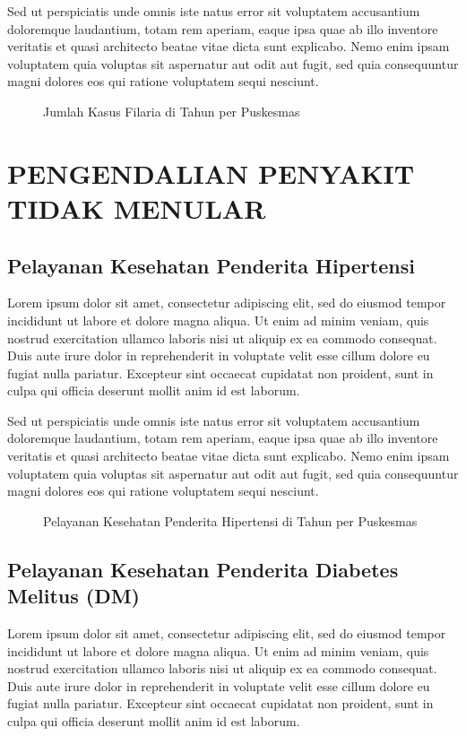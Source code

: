 Sed ut perspiciatis unde omnis iste natus error sit voluptatem accusantium doloremque laudantium, totam rem aperiam, eaque ipsa quae ab illo inventore veritatis et quasi architecto beatae vitae dicta sunt explicabo. Nemo enim ipsam voluptatem quia voluptas sit aspernatur aut odit aut fugit, sed quia consequuntur magni dolores eos qui ratione voluptatem sequi nesciunt.

\begin{figure}[H]
  \centering
  \caption{Jumlah Kasus Filaria di \namaKabupaten Tahun \tP per Puskesmas}
  \label{fig:Kasus-Filaria}
\end{figure}

\section[PENGENDALIAN PTM]{PENGENDALIAN PENYAKIT TIDAK MENULAR}
\subsection{Pelayanan Kesehatan Penderita Hipertensi}
Lorem ipsum dolor sit amet, consectetur adipiscing elit, sed do eiusmod tempor incididunt ut labore et dolore magna aliqua. Ut enim ad minim veniam, quis nostrud exercitation ullamco laboris nisi ut aliquip ex ea commodo consequat. Duis aute irure dolor in reprehenderit in voluptate velit esse cillum dolore eu fugiat nulla pariatur. Excepteur sint occaecat cupidatat non proident, sunt in culpa qui officia deserunt mollit anim id est laborum.

Sed ut perspiciatis unde omnis iste natus error sit voluptatem accusantium doloremque laudantium, totam rem aperiam, eaque ipsa quae ab illo inventore veritatis et quasi architecto beatae vitae dicta sunt explicabo. Nemo enim ipsam voluptatem quia voluptas sit aspernatur aut odit aut fugit, sed quia consequuntur magni dolores eos qui ratione voluptatem sequi nesciunt.

\begin{figure}[H]
  \centering
  \caption{Pelayanan Kesehatan Penderita Hipertensi di \namaKabupaten Tahun \tP per Puskesmas}
  \label{fig:Pelayanan-Hipertensi}
\end{figure}

\subsection{Pelayanan Kesehatan Penderita Diabetes Melitus (DM)}
Lorem ipsum dolor sit amet, consectetur adipiscing elit, sed do eiusmod tempor incididunt ut labore et dolore magna aliqua. Ut enim ad minim veniam, quis nostrud exercitation ullamco laboris nisi ut aliquip ex ea commodo consequat. Duis aute irure dolor in reprehenderit in voluptate velit esse cillum dolore eu fugiat nulla pariatur. Excepteur sint occaecat cupidatat non proident, sunt in culpa qui officia deserunt mollit anim id est laborum.

